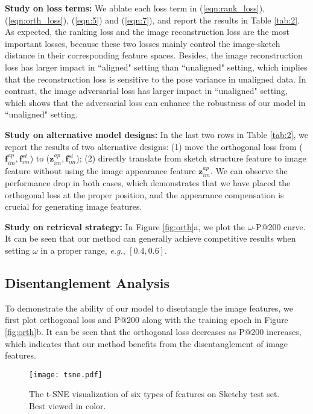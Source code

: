 \documentclass[10pt,twocolumn,letterpaper]{article}
\begin{document}
\noindent\textbf{Study on loss terms: }
We ablate each loss term in (\ref{eqn:rank_loss}), (\ref{eqn:orth_loss}), (\ref{eqn:5}) and (\ref{eqn:7}), and report the results in Table \ref{tab:2}. As expected, the ranking loss and the image reconstruction loss are the most important losses, because these two losses mainly control the image-sketch distance in their corresponding feature spaces. Besides, the image reconstruction loss has larger impact in ``aligned" setting than ``unaligned" setting, which implies that the reconstruction loss is sensitive to the pose variance in unaligned data. In contrast, the image adversarial loss has larger impact in ``unaligned" setting, which shows that the adversarial loss can enhance the robustness of our model in ``unaligned" setting.

\noindent\textbf{Study on alternative model designs: }
In the last two rows in Table \ref{tab:2}, we report the results of two alternative designs: (1) move the orthogonal loss from ($\mathbf{f}_{im}^{ap}, \mathbf{f}_{im}^{st}$) to ($\mathbf{z}_{im}^{ap},\mathbf{f}_{im}^{st}$); (2) directly translate from sketch structure feature to image feature without using the image appearance feature $\mathbf{z}_{im}^{ap}$. We can observe the performance drop in both cases, which demonstrates that we have placed the orthogonal loss at the proper position, and the appearance compensation is crucial for generating image features.

\noindent\textbf{Study on retrieval strategy: }
In Figure \ref{fig:orth}\color{red}a\color{black}, we plot the $\omega$-P@200 curve. It can be seen that our method can generally achieve competitive results when setting $\omega$ in a proper range, \emph{e.g.}, $[0.4, 0.6]$. 

\subsection{Disentanglement Analysis}
To demonstrate the ability of our model to disentangle the image features, we first plot orthogonal loss and P@200 along with the training epoch in Figure \ref{fig:orth}\color{red}b\color{black}. It can be seen that the orthogonal loss decreases as P@200 increases, which indicates that our method benefits from the disentanglement of image features.

\begin{figure}
\begin{center}
\texttt{[image: tsne.pdf]}
\end{center}
\vspace{-10pt}
   \caption{The t-SNE visualization of six types of features on Sketchy test set. Best viewed in color.}
\label{fig:tsne}
\vspace{-15pt}
\end{figure}
\end{document}
